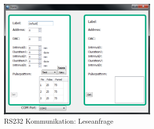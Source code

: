 \begin{figure}[H]
\begin{center}
\includegraphics[width=0.7\textwidth ]{img/general/PCClientBoard.PNG}
\caption{RS232 Kommunikation: Leseanfrage}
\label{figure_RS232Kommunikation}
\end{center}
\end{figure}

